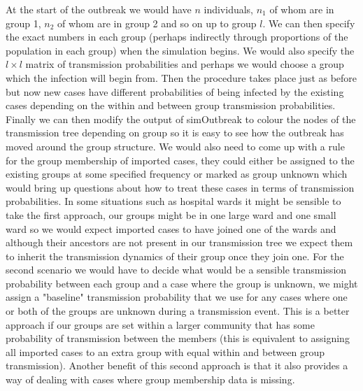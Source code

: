 \documentclass[11pt,a4paper]{report}
\begin{document}
At the start of the outbreak we would have $n$ individuals, $n_1$ of whom are in group 1, $n_2$ of whom are in group 2 and so on up to group $l$. We can then specify the exact numbers in each group (perhaps indirectly through proportions of the population in each group) when the simulation begins. We would also specify the $l \times l$ matrix of transmission probabilities and perhaps we would choose a group which the infection will begin from. Then the procedure takes place just as before but now new cases have different probabilities of being infected by the existing cases depending on the within and between group transmission probabilities. Finally we can then modify the output of simOutbreak to colour the nodes of the transmission tree depending on group so it is easy to see how the outbreak has moved around the group structure. We would also need to come up with a rule for the group membership of imported cases, they could either be assigned to the existing groups at some specified frequency or marked as group unknown which would bring up questions about how to treat these cases in terms of transmission probabilities. In some situations such as hospital wards it might be sensible to take the first approach, our groups might be in one large ward and one small ward so we would expect imported cases to have joined one of the wards and although their ancestors are not present in our transmission tree we expect them to inherit the transmission dynamics of their group once they join one. For the second scenario we would have to decide what would be a sensible transmission probability between each group and a case where the group is unknown, we might assign a "baseline" transmission probability that we use for any cases where one or both of the groups are unknown during a transmission event. This is a better approach if our groups are set within a larger community that has some probability of transmission between the members (this is equivalent to assigning all imported cases to an extra group with equal within and between group transmission). Another benefit of this second approach is that it also provides a way of dealing with cases where group membership data is missing.
\end{document}
